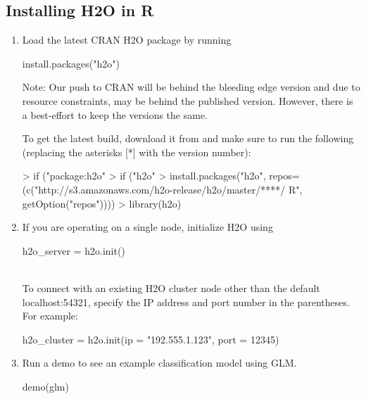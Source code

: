 \documentclass[11pt]{article}
\begin{document}
\subsection{Installing H2O in R}
\begin{enumerate}
\item Load the latest CRAN H2O package by running \begin{spverbatim} install.packages("h2o") \end{spverbatim} 

Note: Our push to CRAN will be behind the bleeding edge version and due to resource constraints, may be behind the published version. However, there is a best-effort to keep the versions the same. 

To get the latest build, download it from  and make sure to run the following (replacing the asterisks [*] with the version number): 
\begin{spverbatim}
> if ("package:h2o" %
> if ("h2o" %
> install.packages("h2o", repos=(c("http://s3.amazonaws.com/h2o-release/h2o/master/****/
R", getOption("repos"))))
> library(h2o)
\end{spverbatim}

\item If you are operating on a single node, initialize H2O using \begin{spverbatim} h2o_server = h2o.init()\end{spverbatim}\\

To connect with an existing H2O cluster node other than the default localhost:54321, specify the IP address and port number in the parentheses. For example: \begin{spverbatim}h2o_cluster = h2o.init(ip = "192.555.1.123", port = 12345)\end{spverbatim}
\item Run a demo to see an example classification model using GLM. 
\begin{spverbatim}
demo(glm)
\end{spverbatim}
\end{enumerate}
\end{document}

